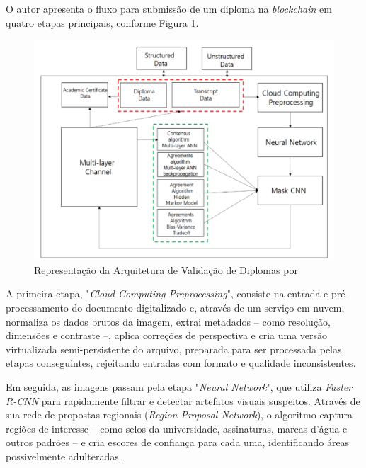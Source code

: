 O autor apresenta o fluxo para submissão de um diploma na \textit{blockchain} em quatro etapas principais, conforme Figura \ref{fig:blockchainforgery}.

\begin{figure}[H]
	\caption{\label{fig:blockchainforgery}Representação da Arquitetura de Validação de Diplomas por \citeauthor*{blockchainforgery}}
    \begin{center}
    \includegraphics[width=1\linewidth]{images/blockchainforgery.png}
	\end{center}
\end{figure}
 
A primeira etapa, "\textit{Cloud Computing Preprocessing}", consiste na entrada e pré-processamento do documento digitalizado e, através de um serviço em nuvem, normaliza os dados brutos da imagem, extrai metadados -- como resolução, dimensões e contraste --, aplica correções de perspectiva e cria uma versão virtualizada semi-persistente do arquivo, preparada para ser processada pelas etapas conseguintes, rejeitando entradas com formato e qualidade inconsistentes.

Em seguida, as imagens passam pela etapa "\textit{Neural Network}", que utiliza \textit{Faster R-CNN} para rapidamente filtrar e detectar artefatos visuais suspeitos. Através de sua rede de propostas regionais (\textit{Region Proposal Network}), o algoritmo captura regiões de interesse -- como selos da universidade, assinaturas, marcas d'água e outros padrões -- e cria escores de confiança para cada uma, identificando áreas possivelmente adulteradas.

